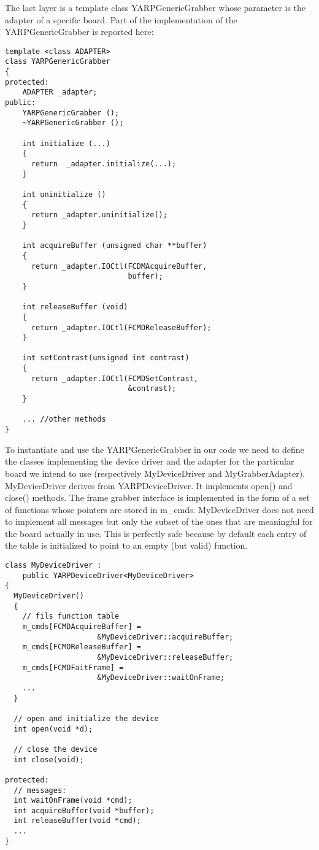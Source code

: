 The last layer is a template class YARPGenericGrabber whose parameter is the adapter of a specific board. Part of the implementation of the YARPGenericGrabber is reported here:

{\small \begin{verbatim}
template <class ADAPTER>
class YARPGenericGrabber
{
protected:
	ADAPTER _adapter;
public:
	YARPGenericGrabber ();
	~YARPGenericGrabber ();

	int initialize (...)
	{
	  return  _adapter.initialize(...);
	}

	int uninitialize ()
	{
	  return _adapter.uninitialize();
	}

	int acquireBuffer (unsigned char **buffer)
	{
	  return _adapter.IOCtl(FCDMAcquireBuffer, 
	                        buffer);
	}

	int releaseBuffer (void)
	{
	  return _adapter.IOCtl(FCMDReleaseBuffer);
	}

	int setContrast(unsigned int contrast)
	{
	  return _adapter.IOCtl(FCMDSetContrast, 
	                        &contrast);
	}

	... //other methods
}
\end{verbatim} }

To instantiate and use the YARPGenericGrabber in our code we need to define the classes implementing the device driver and the adapter for the particular board we intend to use (respectively MyDeviceDriver and MyGrabberAdapter). MyDeviceDriver derives from YARPDeviceDriver. It implements open() and close() methods. The frame grabber interface is implemented in the form of a set of functions whose pointers are stored in m\_cmds. MyDeviceDriver does not need to implement all messages but only the subset of the ones that are meaningful for the board actually in use. This is perfectly safe because by default each entry of the table is initialized to point to an empty (but valid) function.

{\small \begin{verbatim}
class MyDeviceDriver : 
	public YARPDeviceDriver<MyDeviceDriver>
{
  MyDeviceDriver()
  {
    // fils function table
    m_cmds[FCMDAcquireBuffer] =
                     &MyDeviceDriver::acquireBuffer;
    m_cmds[FCMDReleaseBuffer] =
                     &MyDeviceDriver::releaseBuffer;
    m_cmds[FCMDFaitFrame] = 
                     &MyDeviceDriver::waitOnFrame;
    ...
  }

  // open and initialize the device
  int open(void *d);

  // close the device
  int close(void);

protected:
  // messages:
  int waitOnFrame(void *cmd);
  int acquireBuffer(void *buffer);
  int releaseBuffer(void *cmd);
  ...
}
\end{verbatim}}

